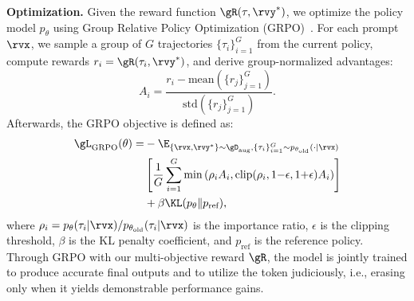 
\textbf{Optimization.}
Given the reward function $\gR(\tau, \rvy^*)$, we optimize the policy model $p_\theta$ using Group Relative Policy Optimization (GRPO)~\citep{shao2024deepseekmath}.
For each prompt $\rvx$, we sample a group of $G$ trajectories $\{\tau_i\}_{i=1}^G$ from the current policy, compute rewards $r_i = \gR(\tau_i, \rvy^*)$, and derive group-normalized advantages:
\begin{equation}
    A_i = \frac{r_i - \text{mean}(\{r_j\}_{j=1}^G)}{\text{std}(\{r_j\}_{j=1}^G)}.
\end{equation}
Afterwards, the GRPO objective is defined as:
\begin{align}
    \gL_\text{GRPO}(\theta) = &-\E_{ \{\rvx, \rvy^*\}\sim \gD_\text{aug}, \{\tau_i\}_{i=1}^G \sim p_{\theta_\text{old}}(\cdot | \rvx )} \\
    & \left[ \frac{1}{G} \sum_{i=1}^G \min\left( \rho_i A_i, \text{clip}(\rho_i, 1{-}\epsilon, 1{+}\epsilon) A_i \right) \right] \\
    & + \beta \KL(p_\theta \| p_\text{ref}),
\end{align}
where $\rho_i = p_\theta(\tau_i|\rvx) / p_{\theta_\text{old}}(\tau_i|\rvx)$ is the importance ratio, $\epsilon$ is the clipping threshold, $\beta$ is the KL penalty coefficient, and $p_\text{ref}$ is the reference policy.
Through GRPO with our multi-objective reward $\gR$, the model is jointly trained to produce accurate final outputs and to utilize the \bk token judiciously, i.e., erasing only when it yields demonstrable performance gains.

